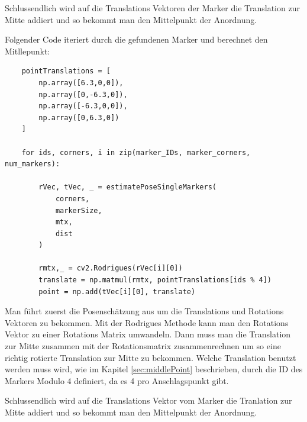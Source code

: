 Schlussendlich wird auf die Translations Vektoren der Marker die Translation zur Mitte addiert 
und so bekommt man den Mittelpunkt der Anordnung. \clearpage


Folgender Code iteriert durch die gefundenen Marker und berechnet den Mitllepunkt: 


\begin{lstlisting}
    pointTranslations = [
        np.array([6.3,0,0]),
        np.array([0,-6.3,0]),
        np.array([-6.3,0,0]),
        np.array([0,6.3,0])
    ]

    for ids, corners, i in zip(marker_IDs, marker_corners, num_markers):
        
        rVec, tVec, _ = estimatePoseSingleMarkers(
            corners,
            markerSize, 
            mtx, 
            dist
        )
    
        rmtx,_ = cv2.Rodrigues(rVec[i][0])
        translate = np.matmul(rmtx, pointTranslations[ids % 4])
        point = np.add(tVec[i][0], translate)
\end{lstlisting}

Man führt zuerst die Posenschätzung aus um die Translations und Rotations Vektoren zu bekommen.
Mit der Rodrigues Methode kann man den Rotations Vektor zu einer Rotations Matrix umwandeln.
Dann muss man die Translation zur Mitte zusammen mit der Rotationsmatrix zusammenrechnen um so eine richtig rotierte Translation zur Mitte zu bekommen.
Welche Translation benutzt werden muss wird, wie im Kapitel \ref{sec:middlePoint} beschrieben, durch die ID des Markers Modulo 4 definiert, da es 4 pro Anschlagspunkt gibt.

Schlussendlich wird auf die Translations Vektor vom Marker die Tranlation zur Mitte addiert und so bekommt man den Mittelpunkt der Anordnung.


